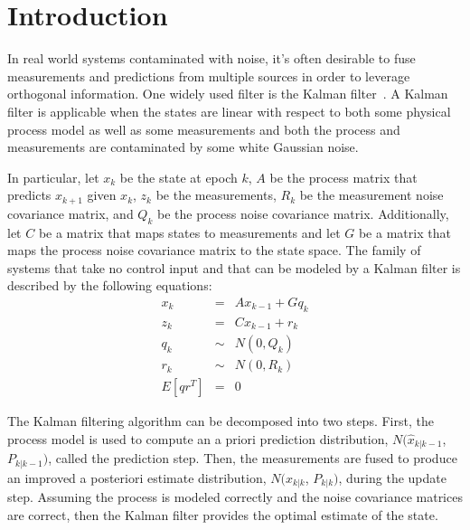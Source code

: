 \section{Introduction}\label{sec:intro}
In real world systems contaminated with noise, it's often desirable to fuse measurements and predictions from multiple sources in order to leverage orthogonal information.  One widely used filter is the Kalman filter~\cite{wiki:kalman}.  A Kalman filter is applicable when the states are linear with respect to both some physical process model as well as some measurements and both the process and measurements are contaminated by some white Gaussian noise.

In particular, let $x_k$ be the state at epoch $k$, $A$ be the process matrix that predicts $x_{k+1}$ given $x_k$, $z_k$ be the measurements, $R_k$ be the measurement noise covariance matrix, and $Q_k$ be the process noise covariance matrix.  Additionally, let $C$ be a matrix that maps states to measurements and let $G$ be a matrix that maps the process noise covariance matrix to the state space.  The family of systems that take no control input and that can be modeled by a Kalman filter is described by the following equations:\\
\begin{equation}
\begin{aligned}
x_{k} &=& A x_{k-1} + G q_{k}\\
z_{k} &=& C x_{k-1} + r_{k}\\
q_{k} &\sim& N(0, Q_k)\\
r_{k} &\sim& N(0, R_k)\\
E[qr^T] &=& 0
\end{aligned}
\end{equation}

The Kalman filtering algorithm can be decomposed into two steps.  First, the process model is used to compute an a priori prediction distribution, $N(\hat{x}_{k|k-1}$, $P_{k|k-1})$, called the prediction step.  Then, the measurements are fused to produce an improved a posteriori estimate distribution, $N(\hat{x}_{k|k}$, $P_{k|k})$, during the update step.  Assuming the process is modeled correctly and the noise covariance matrices are correct, then the Kalman filter provides the optimal estimate of the state.

